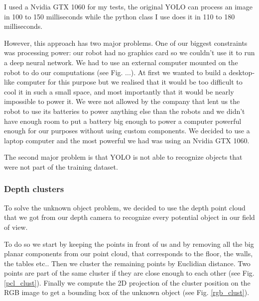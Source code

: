 \documentclass[a4paper, twocolumn]{article}
\begin{document}
    I used a Nvidia GTX 1060 for my tests, the original YOLO can process an image in 100 to 150 milliseconds while the python class I use does it in 110 to 180 milliseconds.

    However, this approach has two major problems. One of our biggest constraints was processing power: our robot had no graphics card so we couldn't use it to run a deep neural network. We had to use an external computer mounted on the robot to do our computations (see Fig. ...). At first we wanted to build a desktop-like computer for this purpose but we realised that it would be too difficult to cool it in such a small space, and most importantly that it would be nearly impossible to power it. We were not allowed by the company that lent us the robot to use its batteries to power anything else than the robots and we didn't have enough room to put a battery big enough to power a computer powerful enough for our purposes without using custom components. We decided to use a laptop computer and the most powerful we had was using an Nvidia GTX 1060.

    The second major problem is that YOLO is not able to recognize objects that were not part of the training dataset.

    \subsubsection{Depth clusters}

    To solve the unknown object problem, we decided to use the depth point cloud that we got from our depth camera to recognize every potential object in our field of view.

    To do so we start by keeping the points in front of us and by removing all the big planar components from our point cloud, that corresponds to the floor, the walls, the tables etc.. Then we cluster the remaining points by Euclidian distance. Two points are part of the same cluster if they are close enough to each other (see Fig. \ref{pcl_clust}). Finally we compute the 2D projection of the cluster position on the RGB image to get a bounding box of the unknown object (see Fig. \ref{rgb_clust}).
\end{document}
